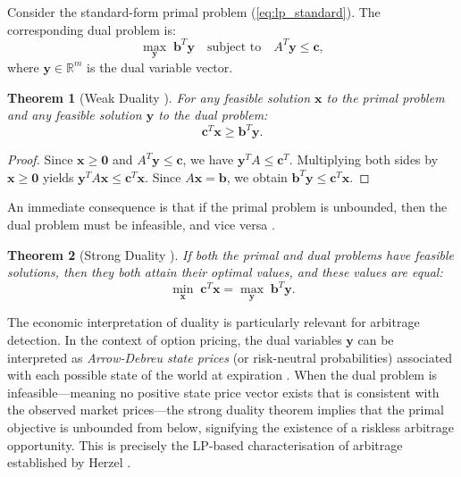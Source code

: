 \documentclass[openany]{book}
\numberwithin{figure}{chapter}
\numberwithin{equation}{chapter}
\newtheorem{theorem}{Theorem}[chapter]
\begin{document}
Consider the standard-form primal problem (\ref{eq:lp_standard}). The corresponding dual problem is:
\begin{equation}
\max_{\mathbf{y}} \; \mathbf{b}^T\mathbf{y} \quad \text{subject to} \quad A^T\mathbf{y} \leq \mathbf{c},
\label{eq:lp_dual}
\end{equation}
where $\mathbf{y} \in \mathbb{R}^m$ is the dual variable vector.

\begin{theorem}[Weak Duality {\cite{bazaraa2006}}]
\label{thm:weak_duality}
For any feasible solution $\mathbf{x}$ to the primal problem and any feasible solution $\mathbf{y}$ to the dual problem:
$$\mathbf{c}^T\mathbf{x} \geq \mathbf{b}^T\mathbf{y}.$$
\end{theorem}

\begin{proof}
Since $\mathbf{x} \geq \mathbf{0}$ and $A^T\mathbf{y} \leq \mathbf{c}$, we have $\mathbf{y}^T A \leq \mathbf{c}^T$. Multiplying both sides by $\mathbf{x} \geq \mathbf{0}$ yields $\mathbf{y}^T A\mathbf{x} \leq \mathbf{c}^T\mathbf{x}$. Since $A\mathbf{x} = \mathbf{b}$, we obtain $\mathbf{b}^T\mathbf{y} \leq \mathbf{c}^T\mathbf{x}$.
\end{proof}

An immediate consequence is that if the primal problem is unbounded, then the dual problem must be infeasible, and vice versa \cite{bazaraa2006}.

\begin{theorem}[Strong Duality {\cite{cornuejols2006}}]
\label{thm:strong_duality}
If both the primal and dual problems have feasible solutions, then they both attain their optimal values, and these values are equal:
$$\min_{\mathbf{x}} \; \mathbf{c}^T\mathbf{x} = \max_{\mathbf{y}} \; \mathbf{b}^T\mathbf{y}.$$
\end{theorem}

The economic interpretation of duality is particularly relevant for arbitrage detection. In the context of option pricing, the dual variables $\mathbf{y}$ can be interpreted as \textit{Arrow-Debreu state prices} (or risk-neutral probabilities) associated with each possible state of the world at expiration \cite{cornuejols2006}. When the dual problem is infeasible---meaning no positive state price vector exists that is consistent with the observed market prices---the strong duality theorem implies that the primal objective is unbounded from below, signifying the existence of a riskless arbitrage opportunity. This is precisely the LP-based characterisation of arbitrage established by Herzel \cite{herzel2005}.
\end{document}

